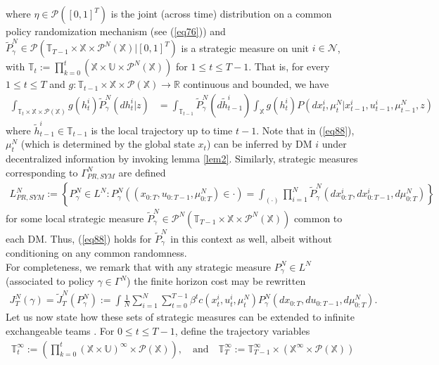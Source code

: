 \documentclass[12pt, oneside]{report}
\newcommand{\mbb}[1]{\mathbb{#1}}
\newcommand{\1}[1]{\mathbbm{1}_{\{#1\}}}
\newcommand{\mc}[1]{\mathcal{#1}}
\theoremstyle{definition}
\begin{document}
where $\eta\in\mc{P}([0,1]^T)$ is the joint (across time) distribution on a
common policy randomization mechanism (see (\ref{eq76})) and
$\widetilde{P}^N_\gamma\in\mc{P}(\mbb{T}_{T-1}\times\mbb{X}\times\mc{P}^N(\mbb{X})|[0,1]^T)$
is a strategic measure on unit $i\in\mc{N}$, with
$\mbb{T}_t:=\prod_{k=0}^t(\mbb{X}\times\mbb{U}\times\mc{P}^N(\mbb{X}))$ for $1\leq
t\leq T-1$. That is, for every $1\leq t\leq T$ and $g:\mbb{T}_{t-1}\times\mbb{X}\times\mc{P}(\mbb{X})\rightarrow\mbb{R}$ continuous and bounded, we have
\begin{align}
    \int_{\mbb{T}_{t}\times\mbb{X}\times\mc{P}(\mbb{X})}g(h^i_{t})\widetilde{P}^N_\gamma(dh^i_{t}|z)
    &=\int_{\mbb{T}_{t-1}}\widetilde{P}^N_\gamma(d\widetilde{h}^i_{t-1})\int_\mbb{X}g(h^i_{t})P(dx^i_t,\mu^N_t|x^i_{t-1},u^i_{t-1},\mu^N_{t-1},z)\label{eq88}
\end{align}
where $\widetilde{h}^i_{t-1}\in\mbb{T}_{t-1}$ is the local trajectory up to time $t-1$. Note that in (\ref{eq88}), $\mu^N_t$ (which is determined by the global state $x_t$) can be inferred by DM $i$ under decentralized information by
invoking lemma \ref{lem2}. Similarly, strategic measures corresponding to $\Gamma^N_{PR,\mathit{SYM}}$ are defined
\begin{align*}
    L^N_{PR,\mathit{SYM}}:=\left\{P^N_\gamma\in L^N:P^N_\gamma((x_{0:T},u_{0:T-1},\mu^N_{0:T})\in\cdot)=\int_{(\cdot)}\prod_{i=1}^N\widetilde{P}^N_\gamma(dx^i_{0:T},dx^i_{0:T-1},d\mu^N_{0:T})\right\}
\end{align*}
for some local strategic measure $\widetilde{P}^N_\gamma\in\mc{P}^N(\mbb{T}_{T-1}\times\mbb{X}\times\mc{P}^N(\mbb{X}))$ common to each DM. Thus, (\ref{eq88}) holds for $\widetilde{P}^N_\gamma$ in this context as well,
albeit without conditioning on any common randomness.\\[5pt]
\indent For completeness, we remark that with any strategic measure $P^N_\gamma\in L^N$ (associated to policy $\gamma\in\Gamma^N$) the finite horizon cost may be rewritten
\begin{align}
    J^N_T(\gamma)=\widetilde{J}^N_T(P^N_\gamma):=\int\frac{1}{N}\sum_{i=1}^N\sum_{t=0}^{T-1}\beta^tc(x^i_t,u^i_t,\mu^N_t) P^N_\gamma(dx_{0:T},du_{0:T-1},d\mu^N_{0:T}).\label{eq91}
\end{align} 
\indent Let us now state how these sets of strategic measures can be extended to infinite exchangeable teams \cite{Sanjari_Saldi_Yüksel_2024}. For $0\leq t\leq T-1$, define the trajectory variables
\begin{align}
    \mbb{T}^\infty_t:=\left(\prod_{k=0}^t(\mbb{X}\times\mbb{U})^\infty\times\mc{P}(\mbb{X})\right),\quad\text{and}\quad \mbb{T}^\infty_T:=\mbb{T}^\infty_{T-1}\times(\mbb{X}^\infty\times\mc{P}(\mbb{X}))
\end{align}
\end{document}
